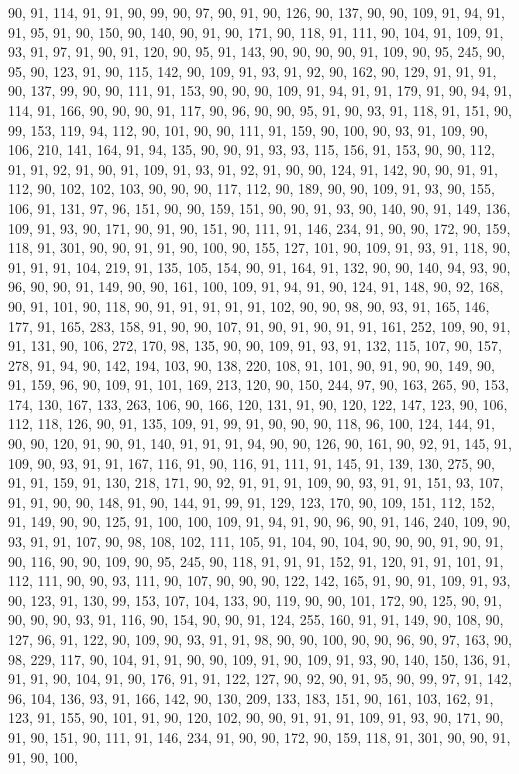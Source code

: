 \begin{sloppypar}
90, 91, 114, 91, 91, 90, 99, 90, 97, 90, 91, 90, 126, 90, 137, 90, 90, 109, 91, 94, 91, 91, 95, 91, 90, 150, 90, 140, 90, 91, 90, 171, 90, 118, 91, 111, 90, 104, 91, 109, 91, 93, 91, 97, 91, 90, 91, 120, 90, 95, 91, 143, 90, 90, 90, 90, 91, 109, 90, 95, 245, 90, 95, 90, 123, 91, 90, 115, 142, 90, 109, 91, 93, 91, 92, 90, 162, 90, 129, 91, 91, 91, 90, 137, 99, 90, 90, 111, 91, 153, 90, 90, 90, 109, 91, 94, 91, 91, 179, 91, 90, 94, 91, 114, 91, 166, 90, 90, 90, 91, 117, 90, 96, 90, 90, 95, 91, 90, 93, 91, 118, 91, 151, 90, 99, 153, 119, 94, 112, 90, 101, 90, 90, 111, 91, 159, 90, 100, 90, 93, 91, 109, 90, 106, 210, 141, 164, 91, 94, 135, 90, 90, 91, 93, 93, 115, 156, 91, 153, 90, 90, 112, 91, 91, 92, 91, 90, 91, 109, 91, 93, 91, 92, 91, 90, 90, 124, 91, 142, 90, 90, 91, 91, 112, 90, 102, 102, 103, 90, 90, 90, 117, 112, 90, 189, 90, 90, 109, 91, 93, 90, 155, 106, 91, 131, 97, 96, 151, 90, 90, 159, 151, 90, 90, 91, 93, 90, 140, 90, 91, 149, 136, 109, 91, 93, 90, 171, 90, 91, 90, 151, 90, 111, 91, 146, 234, 91, 90, 90, 172, 90, 159, 118, 91, 301, 90, 90, 91, 91, 90, 100, 90, 155, 127, 101, 90, 109, 91, 93, 91, 118, 90, 91, 91, 91, 104, 219, 91, 135, 105, 154, 90, 91, 164, 91, 132, 90, 90, 140, 94, 93, 90, 96, 90, 90, 91, 149, 90, 90, 161, 100, 109, 91, 94, 91, 90, 124, 91, 148, 90, 92, 168, 90, 91, 101, 90, 118, 90, 91, 91, 91, 91, 91, 102, 90, 90, 98, 90, 93, 91, 165, 146, 177, 91, 165, 283, 158, 91, 90, 90, 107, 91, 90, 91, 90, 91, 91, 161, 252, 109, 90, 91, 91, 131, 90, 106, 272, 170, 98, 135, 90, 90, 109, 91, 93, 91, 132, 115, 107, 90, 157, 278, 91, 94, 90, 142, 194, 103, 90, 138, 220, 108, 91, 101, 90, 91, 90, 90, 149, 90, 91, 159, 96, 90, 109, 91, 101, 169, 213, 120, 90, 150, 244, 97, 90, 163, 265, 90, 153, 174, 130, 167, 133, 263, 106, 90, 166, 120, 131, 91, 90, 120, 122, 147, 123, 90, 106, 112, 118, 126, 90, 91, 135, 109, 91, 99, 91, 90, 90, 90, 118, 96, 100, 124, 144, 91, 90, 90, 120, 91, 90, 91, 140, 91, 91, 91, 94, 90, 90, 126, 90, 161, 90, 92, 91, 145, 91, 109, 90, 93, 91, 91, 167, 116, 91, 90, 116, 91, 111, 91, 145, 91, 139, 130, 275, 90, 91, 91, 159, 91, 130, 218, 171, 90, 92, 91, 91, 91, 109, 90, 93, 91, 91, 151, 93, 107, 91, 91, 90, 90, 148, 91, 90, 144, 91, 99, 91, 129, 123, 170, 90, 109, 151, 112, 152, 91, 149, 90, 90, 125, 91, 100, 100, 109, 91, 94, 91, 90, 96, 90, 91, 146, 240, 109, 90, 93, 91, 91, 107, 90, 98, 108, 102, 111, 105, 91, 104, 90, 104, 90, 90, 90, 91, 90, 91, 90, 116, 90, 90, 109, 90, 95, 245, 90, 118, 91, 91, 91, 152, 91, 120, 91, 91, 101, 91, 112, 111, 90, 90, 93, 111, 90, 107, 90, 90, 90, 122, 142, 165, 91, 90, 91, 109, 91, 93, 90, 123, 91, 130, 99, 153, 107, 104, 133, 90, 119, 90, 90, 101, 172, 90, 125, 90, 91, 90, 90, 90, 93, 91, 116, 90, 154, 90, 90, 91, 124, 255, 160, 91, 91, 149, 90, 108, 90, 127, 96, 91, 122, 90, 109, 90, 93, 91, 91, 98, 90, 90, 100, 90, 90, 96, 90, 97, 163, 90, 98, 229, 117, 90, 104, 91, 91, 90, 90, 109, 91, 90, 109, 91, 93, 90, 140, 150, 136, 91, 91, 91, 90, 104, 91, 90, 176, 91, 91, 122, 127, 90, 92, 90, 91, 95, 90, 99, 97, 91, 142, 96, 104, 136, 93, 91, 166, 142, 90, 130, 209, 133, 183, 151, 90, 161, 103, 162, 91, 123, 91, 155, 90, 101, 91, 90, 120, 102, 90, 90, 91, 91, 91, 109, 91, 93, 90, 171, 90, 91, 90, 151, 90, 111, 91, 146, 234, 91, 90, 90, 172, 90, 159, 118, 91, 301, 90, 90, 91, 91, 90, 100, 
\end{sloppypar}
